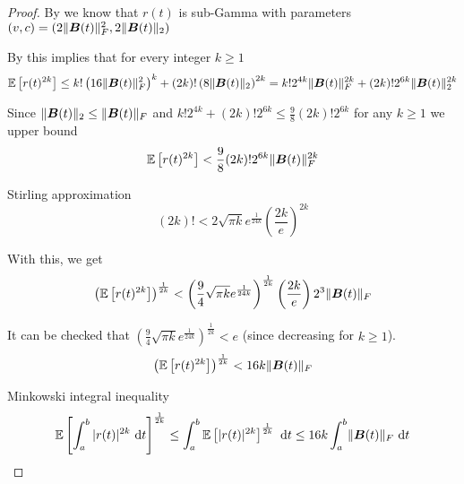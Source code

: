 \documentclass[12pt]{article}
\begin{document}
\begin{proof}
By \cite[Proof of Lemma 3]{cortinovis-2022-randomized-trace} we know that $r(t)$ is sub-Gamma with parameters $(v, c) = (2 \lVert \boldsymbol{B}(t) \rVert _F^2, 2 \lVert \boldsymbol{B}(t) \rVert _2)$

By \cite[Theorem 2.3]{boucheron-2013-basic-inequalities} this implies that for every integer $k \geq 1$
\begin{equation}
    \mathbb{E}\left[ r(t)^{2 k} \right]
    \leq k! \left( 16 \lVert \boldsymbol{B}(t) \rVert _F^2 \right)^k + (2 k)! \left( 8 \lVert \boldsymbol{B}(t) \rVert _2 \right)^{2 k}
    = k! 2^{4 k} \lVert \boldsymbol{B}(t) \rVert _F^{2 k} + (2 k)! 2^{6 k} \lVert \boldsymbol{B}(t) \rVert _2^{2 k}
\end{equation}

Since $\lVert \boldsymbol{B}(t) \rVert _2 \leq \lVert \boldsymbol{B}(t) \rVert _F$ and $k! 2^{4 k} + (2 k)! 2^{6 k} \leq \frac{9}{8}(2 k)! 2^{6 k}$ for any $k \geq 1$ we upper bound 
\begin{equation}
    \mathbb{E}\left[ r(t)^{2 k} \right] < \frac{9}{8} (2 k)! 2^{6 k} \lVert \boldsymbol{B}(t) \rVert _F^{2k}
\end{equation}

Stirling approximation \cite{robbins-1955-remark-stirling} 
\begin{equation}
    (2 k)! < 2 \sqrt{\pi k}  e^{\frac{1}{24 k}} \left(\frac{2 k}{e} \right)^{2 k}
\end{equation}

With this, we get
\begin{equation}
    \left( \mathbb{E}\left[ r(t)^{2 k} \right] \right)^{\frac{1}{2k}}
    < \left( \frac{9}{4} \sqrt{\pi k} e^{\frac{1}{24 k}} \right)^{\frac{1}{2k}} \left( \frac{2 k}{e}\right) 2^{3} \lVert \boldsymbol{B}(t) \rVert _F
\end{equation}

It can be checked that $(\frac{9}{4} \sqrt{\pi k} e^{\frac{1}{24 k}})^{\frac{1}{2k}} < e$ (since decreasing for $k \geq 1$).
\begin{equation}
    \left( \mathbb{E}\left[ r(t)^{2 k} \right] \right)^{\frac{1}{2k}}
    < 16 k \lVert \boldsymbol{B}(t) \rVert _F
\end{equation}

Minkowski integral inequality \cite[Theorem 2.2]{hardy-1952-inequalities}
\begin{equation}
    \mathbb{E}\left[ \int_{a}^{b} |r(t)|^{2 k}~\mathrm{d}t  \right]^{\frac{1}{2 k}}
    \leq \int_{a}^{b} \mathbb{E}\left[ |r(t)|^{2 k}\right]^{\frac{1}{2 k}}~\mathrm{d}t
    \leq 16 k \int_{a}^{b} \lVert \boldsymbol{B}(t) \rVert _F~\mathrm{d}t
\end{equation}


\end{proof}
\end{document}
